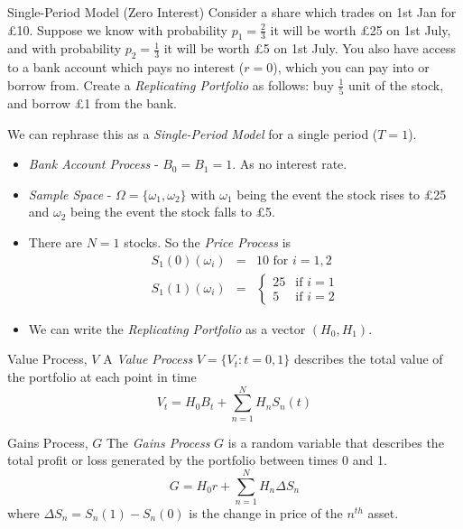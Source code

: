 \documentclass[11pt,a4paper]{article}
\begin{document}
  \begin{example}{Single-Period Model (Zero Interest)}
    Consider a share which trades on 1st Jan for £10. Suppose we know with probability $p_1=\frac23$ it will be worth £25 on 1st July, and with probability $p_2=\frac13$ it will be worth £5 on 1st July. You also have access to a bank account which pays no interest ($r=0$), which you can pay into or borrow from. Create a \textit{Replicating Portfolio} as follows: buy $\frac15$ unit of the stock, and borrow £1 from the bank.
    \par We can rephrase this as a \textit{Single-Period Model} for a single period ($T=1$).
    \begin{itemize}
      \item \textit{Bank Account Process} - $B_0=B_1=1$. As no interest rate.
      \item \textit{Sample Space} - $\Omega=\{\omega_1,\omega_2\}$ with $\omega_1$ being the event the stock rises to £25 and $\omega_2$ being the event the stock falls to £5.
      \item There are $N=1$ stocks. So the \textit{Price Process} is
      \[\begin{array}{rcl}
        S_1(0)(\omega_i)&=&10\text{ for }i=1,2\\
        S_1(1)(\omega_i)&=&\begin{cases}
          25&\text{if }i=1\\
          5&\text{if }i=2
        \end{cases}
      \end{array}\]
      \item We can write the \textit{Replicating Portfolio} as a vector $(H_0,H_1)$.
    \end{itemize}
  \end{example}

  \begin{definition}{Value Process, $V$}
    A \textit{Value Process} $V=\{V_t:t=0,1\}$ describes the total value of the portfolio at each point in time
    \[ V_t=H_0B_t+\sum_{n=1}^NH_nS_n(t) \]
  \end{definition}

  \begin{definition}{Gains Process, $G$}
    The \textit{Gains Process} $G$ is a random variable that describes the total profit or loss generated by the portfolio between times 0 and 1.
    \[ G=H_0r+\sum_{n=1}^NH_n\Delta S_n \]
    where $\Delta S_n=S_n(1)-S_n(0)$ is the change in price of the $n^{th}$ asset.
  \end{definition}
\end{document}
